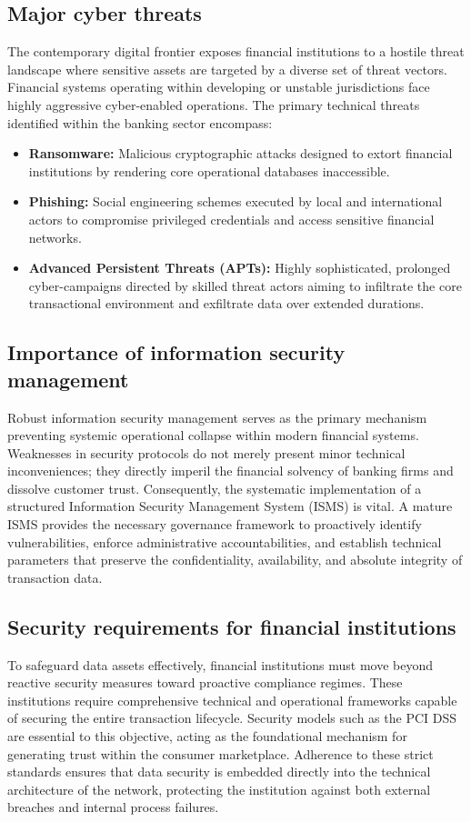 \documentclass[12pt,a4paper,oneside]{report}
\begin{document}
	\subsection{Major cyber threats}
	The contemporary digital frontier exposes financial institutions to a hostile threat landscape where sensitive assets are targeted by a diverse set of threat vectors. Financial systems operating within developing or unstable jurisdictions face highly aggressive cyber-enabled operations. The primary technical threats identified within the banking sector encompass:
	\begin{itemize}
		\item \textbf{Ransomware:} Malicious cryptographic attacks designed to extort financial institutions by rendering core operational databases inaccessible.
		\item \textbf{Phishing:} Social engineering schemes executed by local and international actors to compromise privileged credentials and access sensitive financial networks.
		\item \textbf{Advanced Persistent Threats (APTs):} Highly sophisticated, prolonged cyber-campaigns directed by skilled threat actors aiming to infiltrate the core transactional environment and exfiltrate data over extended durations.
	\end{itemize}
	
	\subsection{Importance of information security management}
	Robust information security management serves as the primary mechanism preventing systemic operational collapse within modern financial systems. Weaknesses in security protocols do not merely present minor technical inconveniences; they directly imperil the financial solvency of banking firms and dissolve customer trust. Consequently, the systematic implementation of a structured Information Security Management System (ISMS) is vital. A mature ISMS provides the necessary governance framework to proactively identify vulnerabilities, enforce administrative accountabilities, and establish technical parameters that preserve the confidentiality, availability, and absolute integrity of transaction data.
	
	\subsection{Security requirements for financial institutions}
	To safeguard data assets effectively, financial institutions must move beyond reactive security measures toward proactive compliance regimes. These institutions require comprehensive technical and operational frameworks capable of securing the entire transaction lifecycle. Security models such as the PCI DSS are essential to this objective, acting as the foundational mechanism for generating trust within the consumer marketplace. Adherence to these strict standards ensures that data security is embedded directly into the technical architecture of the network, protecting the institution against both external breaches and internal process failures.
	
\end{document}
